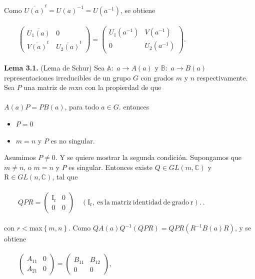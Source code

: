 \documentclass[12pt]{book}
\theoremstyle{definition}
\newcounter{in}
\begin{document}
Como $\overline{U(a)}^{t}=U(a)^{-1}=U(a^{-1})$, se obtiene\\~\\
$\qquad
\begin{pmatrix}
\overline{U_{1}(a)} & 0 \\ 
\overline{V(a)}^{t} & \overline{U_{2}(a)}^{t}
\end{pmatrix}
=
\begin{pmatrix}
U_{1}(a^{-1}) & V(a^{-1}) \\ 
0 & U_{2}(a^{-1})
\end{pmatrix}$.\\~\\
\textbf{Lema 3.1.} (Lema de Schur) Sea $\mathbb{A}:$ $a\rightarrow A\left(a\right)$ y $\mathbb{B}:$ $a\rightarrow B\left(a\right)$ representaciones irreducibles de un grupo $G$ con grados $m$ y $n$ respectivamente. Sea $P$ una matriz de $m$x$n$ con la propierdad de que\\~\\
$A(a)P=PB(a)$, para todo $a \in G$.
entonces\\
\begin{itemize}
\item $P=0$
\item $m=n$ y $P$ es no singular.
\end{itemize}
Asumimos $P \neq 0$. Y se quiere mostrar la segunda condición. Supongamos que $m \neq n$, o $m=n$ y $P$ es singular. Entonces existe $Q \in GL(m,\mathbb{C})$ y $\mathrm{R} \in GL(n,\mathbb{C})$, tal que\\~\\
$\qquad
QPR=
\begin{pmatrix}
\mathrm{I_{r}} & 0 \\ 
0 & 0
\end{pmatrix} \quad \mathrm{(I_{r},\ es\ la\ matriz\ identidad\ de\ grado\ r).\ }$.\\~\\
con $r<$max$\left\{ m,n \right\}$. Como $QA(a)Q^{-1}(QPR) = QPR(R^{-1}B(a)R)$, y se obtiene\\~\\
$\qquad
\begin{pmatrix}
A_{11} & 0 \\ 
A_{21} & 0
\end{pmatrix}
=
\begin{pmatrix}
B_{11} & B_{12} \\ 
0 & 0
\end{pmatrix},$ \\~\\
\end{document}
